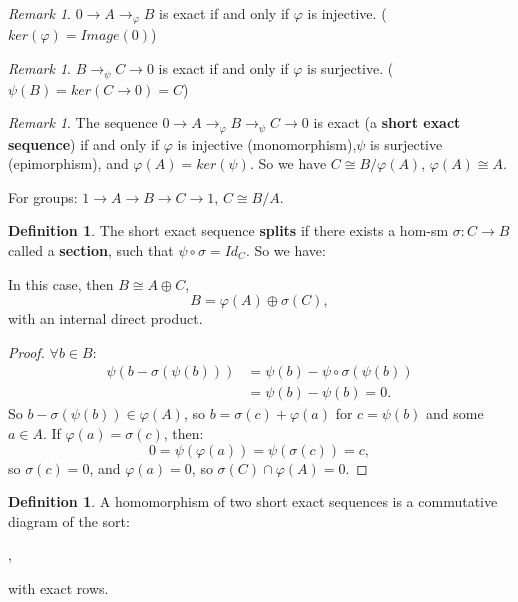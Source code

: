 \documentclass[12pt]{amsbook}
\theoremstyle{plain}
\numberwithin{section}{chapter}
\numberwithin{equation}{chapter}
\theoremstyle{definition}
\newtheorem{Def}[theorem]{Definition}
\theoremstyle{remark}
\newtheorem{rem}[theorem]{Remark}
\newcommand{\bee}{\begin{equation}\begin{aligned}}
\newcommand{\eee}{\end{aligned}\end{equation}}
\renewcommand{\phi}{\varphi}
\begin{document}
\begin{rem}\label{exact1}
$0 \to A \to_{\phi} B$ is exact if and only if $\phi$ is injective. ($ker(\phi) = Image(0)$)
\end{rem}

\begin{rem}\label{exact2}
$B \to_\psi C \to 0$ is exact if and only if $\phi$ is surjective. ($\psi(B) = ker(C \to 0) = C$)
\end{rem}

\begin{rem}
The sequence $0 \to A \to_{\phi} B \to_{\psi} C \to 0$ is exact (a \textbf{short exact sequence}) if and only if $\phi$ is injective (monomorphism),$\psi$ is surjective (epimorphism), and $\phi(A) = ker(\psi)$. So we have $C \cong B/\phi(A)$, $\phi(A) \cong A$. 
\end{rem}

For groups: $1 \to A \to B \to C \to 1$, $C \cong B/A$. 

\begin{Def}
The short exact sequence \textbf{splits} if there exists a hom-sm $\sigma:C \to B$ called a \textbf{section}, such that $\psi \circ \sigma = Id_C$. So we have:
\begin{center}
\end{center}
In this case, then $B \cong A \oplus C$,
$$
B = \phi(A) \oplus \sigma(C),
$$
with an internal direct product. 
\end{Def}

\begin{proof} 
$\forall b \in B$:
\bee
\psi(b - \sigma(\psi(b))) &= \psi(b) - \psi \circ \sigma(\psi(b))\\
&= \psi(b) - \psi(b) = 0.
\eee
So $b - \sigma(\psi(b)) \in \phi(A)$, so $b = \sigma(c) + \phi(a)$ for $c = \psi(b)$ and some $a \in A$. If $\phi(a) = \sigma(c)$, then:
$$
0 = \psi(\phi(a)) = \psi(\sigma(c)) = c,
$$
so $\sigma(c) = 0$, and $\phi(a) = 0$, so $\sigma(C) \cap \phi(A) = 0$. 
\end{proof}

\begin{Def}
A homomorphism of two short exact sequences is a commutative diagram of the sort:
\begin{center}
,
\end{center}
with exact rows. 
\end{Def}
\end{document}
